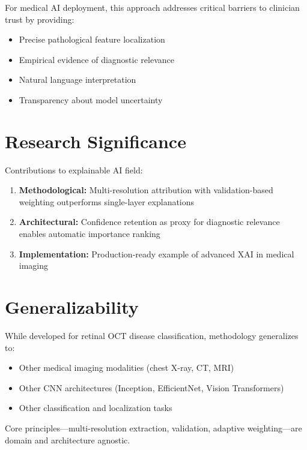 \documentclass[12pt,a4paper,oneside]{book}
\begin{document}
For medical AI deployment, this approach addresses critical barriers to clinician trust by providing:

\begin{itemize}
  \item Precise pathological feature localization
  \item Empirical evidence of diagnostic relevance
  \item Natural language interpretation
  \item Transparency about model uncertainty
\end{itemize}

\section{Research Significance}

Contributions to explainable AI field:

\begin{enumerate}
  \item \textbf{Methodological:} Multi-resolution attribution with validation-based weighting outperforms single-layer explanations
  
  \item \textbf{Architectural:} Confidence retention as proxy for diagnostic relevance enables automatic importance ranking
  
  \item \textbf{Implementation:} Production-ready example of advanced XAI in medical imaging
\end{enumerate}

\section{Generalizability}

While developed for retinal OCT disease classification, methodology generalizes to:

\begin{itemize}
  \item Other medical imaging modalities (chest X-ray, CT, MRI)
  \item Other CNN architectures (Inception, EfficientNet, Vision Transformers)
  \item Other classification and localization tasks
\end{itemize}

Core principles—multi-resolution extraction, validation, adaptive weighting—are domain and architecture agnostic.
\end{document}
